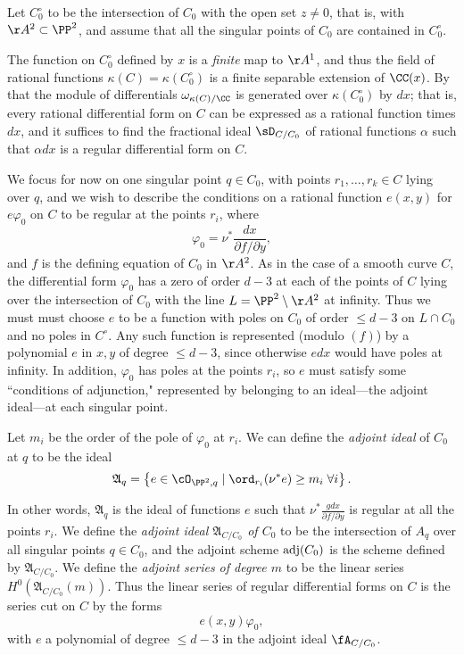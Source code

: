 Let $C^\circ_0$ to be the intersection of $C_0$ with the open set $z \neq 0$, that is, with $\AA^2\subset \PP^2$, and assume that
all the singular points of $C_0$ are contained in $C^\circ_0$.

The function on $C^\circ_0$ defined by $x$  
is a \emph{finite} map to $\AA^1$, and thus the field of rational functions $\kappa(C) = \kappa(C^\circ_0)$ is a finite
separable extension of $\CC(x)$. By~\cite[Section 16.5]{Eisenbud1995} that the module of differentials 
$\omega_{\kappa(C)/\CC}$ is generated over $\kappa(C^\circ_0)$ by $dx$; that is, every rational
differential form on $C$ can be expressed as a rational function
times $dx$, and it suffices to find the fractional ideal $\sD_{C/C_{0}}$ of rational functions $\alpha$ such
that $\alpha dx$ is a regular differential form on $C$. 

We focus for now on one singular point $q \in C_0$, with points $r_1,\dots,r_k \in C$ lying over $q$, and we wish to describe the conditions on a rational function $e(x,y)$ for  $e\varphi_0$ on $C$ to be regular
at the points $r_{i}$, where
$$
\varphi_0 = \nu^* \frac{dx}{\partial f/\partial y},
$$
and $f$ is the defining equation of $C_0$ in $\AA^2$. As in the case of a smooth curve $C$, the differential
form $\varphi_0$ has a zero of order $d-3$ at each of the points of $C$ lying over the intersection of $C_0$ with the line  $L = \PP^2\setminus \AA^2$
at infinity. Thus we must must choose $e$ to be a function with poles on $C_0$ of order $\leq d-3$ on $L\cap C_0$ and no poles in $C^\circ$. Any such function is represented (modulo $(f)$) by 
a polynomial $e$ in $x,y$ of degree $\leq d-3$, since otherwise $edx$ would have poles at infinity. In addition, $\varphi_0$ has poles at the points $r_i$,
so $e$ must satisfy some ``conditions of adjunction," represented by belonging to an ideal---the adjoint ideal---at each singular point.

Let $m_i$ be the order of the pole of $\varphi_0$ at $r_i$. We can define the \emph{adjoint ideal} of $C_0$ at $q$ to be the ideal
$$
\mathfrak A_{q} = \left\{ e \in \cO_{\PP^2, q} \mid \ord_{r_i}(\nu^*e) \geq m_i \; \forall i \right\}.
$$

In other words, $\mathfrak A_q$ is the ideal of functions $e$ such that $\nu^* \frac{gdx}{\partial f/\partial y}$ is regular at all the points $r_i$. We define the \emph{adjoint ideal $\mathfrak A_{C/C_0}$ of $C_0$} to be the intersection of $A_q$ over all singular points  $q \in C_0$, 
and the adjoint scheme $\adj(C_{0})$ is the scheme defined by $\mathfrak A_{C/C_0}$. We define
the \emph{adjoint series of degree $m$} to be the linear series $H^0(\mathfrak A_{C/C_0}(m))$. 
Thus the linear series of regular differential forms on  $C$ is the series cut on $C$ by the forms
$$
e(x,y) \varphi_0,
$$
with $e$ a polynomial of degree $\leq d-3$ in the adjoint ideal $\fA_{C/C_0}$.

